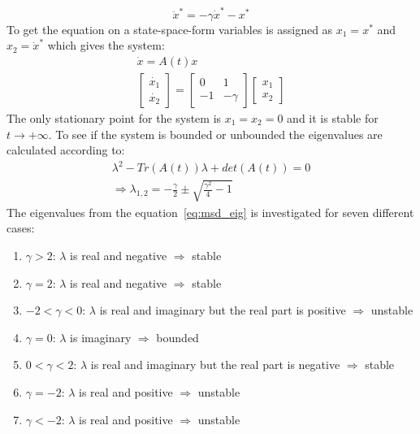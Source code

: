 \documentclass[
  twoside,
  11pt, a4paper,
  footinclude=true,
  headinclude=true,
  cleardoublepage=empty
]{scrbook}
\begin{document}
\begin{equation}
	\ddot{x}^*=-\gamma\dot{x}^*-x^*
\end{equation}
To get the equation on a state-space-form variables is assigned as $x_1=x^*$ and $x_2=\dot{x}^*$ which gives the system:
\begin{equation}
	\begin{gathered}
		\dot{x}=A(t)x\\
		\begin{bmatrix}
			\dot{x_1}\\
			\dot{x_2}
		\end{bmatrix}=\begin{bmatrix}
			0	&	1\\
			-1	&	-\gamma
		\end{bmatrix}\begin{bmatrix}
			x_1\\
			x_2
		\end{bmatrix}
	\end{gathered}
\end{equation}
The only stationary point for the system is $x_1=x_2=0$ and it is stable for $t\rightarrow+\infty$. To see if the system is bounded or unbounded the eigenvalues are calculated according to:
\begin{equation}\label{eq:msd_eig}
	\begin{gathered}
		\lambda^2-Tr(A(t))\lambda+det(A(t))=0\\
		\Rightarrow \lambda_{1,2}=-\frac{\gamma}{2} \pm \sqrt{\frac{\gamma^2}{4}-1}
	\end{gathered}
\end{equation}
\newpage
The eigenvalues from the equation~\eqref{eq:msd_eig} is investigated for seven different cases: 
\begin{enumerate}
	\item $\gamma > 2$: $\lambda$ is real and negative $\Rightarrow$ stable
	\item $\gamma = 2$: $\lambda$ is real and negative $\Rightarrow$ stable
	\item $-2<\gamma <0$: $\lambda$ is real and imaginary but the real part is positive $\Rightarrow$ unstable
	\item $\gamma = 0$: $\lambda$ is imaginary $\Rightarrow$ bounded
	\item $0<\gamma <2$: $\lambda$ is real and imaginary but the real part is negative $\Rightarrow$ stable
	\item $\gamma = -2$: $\lambda$ is real and positive $\Rightarrow$ unstable
	\item $\gamma < -2$: $\lambda$ is real and positive $\Rightarrow$ unstable
\end{enumerate}
\end{document}

